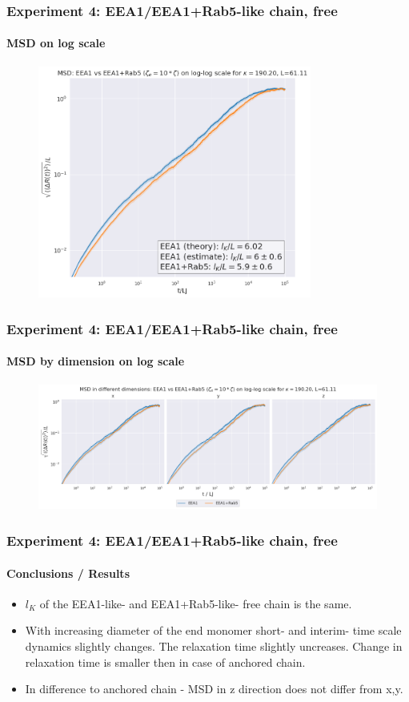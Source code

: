 \documentclass[handout]{beamer}
\begin{document}
\begin{frame}
    \frametitle{Experiment 4: EEA1/EEA1+Rab5-like chain, free}
    \framesubtitle{MSD on log scale}
    \begin{figure}[h]
        \includegraphics[width=9cm]{./17-exp-msd-log.png}
    \end{figure}
\end{frame}

\begin{frame}
    \frametitle{Experiment 4: EEA1/EEA1+Rab5-like chain, free}
    \framesubtitle{MSD by dimension on log scale}
    \begin{figure}[h]
        \includegraphics[width=11.2cm]{./17-exp-msd-dim-log.png}
    \end{figure}
\end{frame}

\begin{frame}
    \frametitle{Experiment 4: EEA1/EEA1+Rab5-like chain, free}
    \framesubtitle{Conclusions / Results}
    \begin{itemize}
        \item $l_K$ of the EEA1-like- and EEA1+Rab5-like- free chain is the same.
        \item With increasing diameter of the end monomer short- and interim- time
        scale dynamics slightly changes. The relaxation time slightly uncreases. 
        Change in relaxation time is smaller then in case of anchored chain.
        \item In difference to anchored chain - MSD in z direction does not differ from x,y.
    \end{itemize}
\end{frame}
\end{document}
